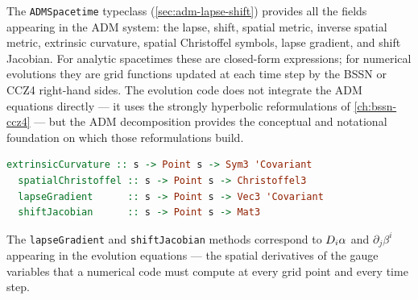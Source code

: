 The \texttt{ADMSpacetime} typeclass (\cref{sec:adm-lapse-shift}) provides
all the fields appearing in the ADM system: the lapse, shift, spatial
metric, inverse spatial metric, extrinsic curvature, spatial Christoffel
symbols, lapse gradient, and shift Jacobian.  For analytic spacetimes these
are closed-form expressions; for numerical evolutions they are grid
functions updated at each time step by the BSSN or CCZ4 right-hand sides.
The evolution code does not integrate the ADM equations directly ---
it uses the strongly hyperbolic reformulations of \cref{ch:bssn-ccz4} ---
but the ADM decomposition provides the conceptual and notational foundation
on which those reformulations build.
%
\begin{lstlisting}[language=Haskell]
  extrinsicCurvature :: s -> Point s -> Sym3 'Covariant
  spatialChristoffel :: s -> Point s -> Christoffel3
  lapseGradient      :: s -> Point s -> Vec3 'Covariant
  shiftJacobian      :: s -> Point s -> Mat3
\end{lstlisting}
%
The \texttt{lapseGradient} and \texttt{shiftJacobian} methods correspond to
$D_i\alpha$ and $\partial_j\beta^i$ appearing in the evolution equations
--- the spatial derivatives of the gauge variables that a numerical code
must compute at every grid point and every time step.
